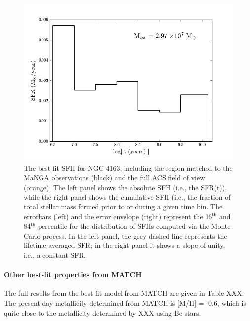 \documentclass[preprint2]{aastex62}
\begin{document}
\begin{figure}
  \begin{center}
    \includegraphics[width=\linewidth]{figs/figSFH.png}
    \caption{The best fit SFH for NGC 4163, including the region matched to the MaNGA observations (black) and the full ACS field of view (orange). The left panel shows the absolute SFH (i.e., the SFR(t)), while the right panel shows the cumulative SFH (i.e., the fraction of total stellar mass formed prior to or during a given time bin. The errorbars (left) and the error envelope (right) represent the 16$^{\mathrm{th}}$ and 84$^{\mathrm{th}}$ percentile for the distribution of SFHs computed via the Monte Carlo process. In the left panel, the grey dashed line represents the lifetime-averaged SFR; in the right panel it shows a slope of unity, i.e., a constant SFR.}
    \label{fig:matchSFH}
  \end{center}
\end{figure}
\paragraph{Other best-fit properties from MATCH}

The full results from the best-fit model from MATCH are given in Table XXX. The present-day metallicity determined from MATCH is [M/H] = -0.6, which is quite close to the metallicity determined by XXX using Be stars.
\end{document}
